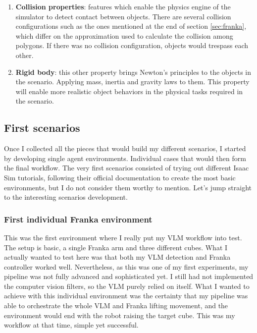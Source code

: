 \begin{enumerate}
	\item \textbf{Collision properties}: features which enable the physics engine of the simulator to detect contact between objects. There are several collision configurations such as the ones mentioned at the end of section \ref{sec:franka}, which differ on the approximation used to calculate the collision among polygons. If there was no collision configuration, objects would trespass each other.  
	
	\item \textbf{Rigid body}: this other property brings Newton's principles to the objects in the scenario. Applying mass, inertia and gravity laws to them. This property will enable more realistic object behaviors in the physical tasks required in the scenario.  
\end{enumerate}

\subsection{First scenarios}
Once I collected all the pieces that would build my different scenarios, I started by developing single agent environments. Individual cases that would then form the final workflow. The very first scenarios consisted of trying out different Isaac Sim tutorials, following their official documentation to create the most basic environments, but I do not consider them worthy to mention. Let's jump straight to the interesting scenarios development. 

\subsubsection{First individual Franka environment}
This was the first environment where I really put my VLM workflow into test. The setup is basic, a single Franka arm and three different cubes. What I actually wanted to test here was that both my VLM detection and Franka controller worked well. Nevertheless, as this was one of my first experiments, my pipeline was not fully advanced and sophisticated yet. I still had not implemented the computer vision filters, so the VLM purely relied on itself. What I wanted to achieve with this individual environment was the certainty that my pipeline was able to orchestrate the whole VLM and Franka lifting movement, and the environment would end with the robot raising the target cube. This was my workflow at that time, simple yet successful.

